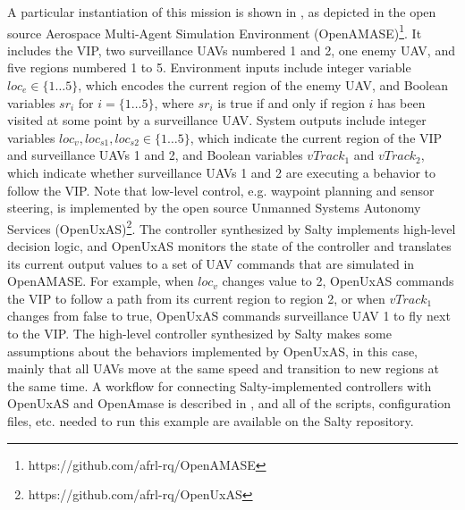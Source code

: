 \documentclass[runningheads]{llncs}
\begin{document}
A particular instantiation of this mission is shown in , as depicted in 
the open source Aerospace Multi-Agent Simulation Environment (OpenAMASE)\footnote{https://github.com/afrl-rq/OpenAMASE}. 
It includes the VIP, two surveillance UAVs numbered 1 and 2, one enemy UAV, and five regions numbered 1 to 5. 
Environment inputs include integer variable $loc_e \in \{1 \dots 5\}$, which encodes the current region of the enemy UAV, 
and Boolean variables $sr_i$ for $i = \{1 \ldots 5\}$, where $sr_i$ is true if and only if region $i$ has been visited at some point by a surveillance UAV. 
System outputs include integer variables $loc_v, loc_{s1}, loc_{s2} \in \{1 \dots 5\}$, which indicate the current region of the 
VIP and surveillance UAVs 1 and 2, and Boolean variables $vTrack_1$ and $vTrack_2$, which indicate whether surveillance UAVs 1 and 2 
are executing a behavior to follow the VIP. 
Note that low-level control, e.g. waypoint planning and sensor steering, 
is implemented by the open source Unmanned Systems Autonomy Services (OpenUxAS)\footnote{https://github.com/afrl-rq/OpenUxAS}. 
The controller synthesized by Salty implements high-level decision logic, 
and OpenUxAS monitors the state of the controller and translates its current output values to a set of UAV commands that are simulated in OpenAMASE.
For example, when $loc_v$ changes value to 2, OpenUxAS commands the VIP to follow a path from its current region to region 2, 
or when $vTrack_1$ changes from false to true, OpenUxAS commands surveillance UAV 1 to fly next to the VIP. 
The high-level controller synthesized by Salty makes some assumptions about the behaviors implemented by OpenUxAS, 
in this case, mainly that all UAVs move at the same speed and transition to new regions at the same time. 
A workflow for connecting Salty-implemented controllers with OpenUxAS and OpenAmase is described in \cite{elliott2019salty}, 
and all of the scripts, configuration files, etc. needed to run this example are available on the Salty repository.


\end{document}
